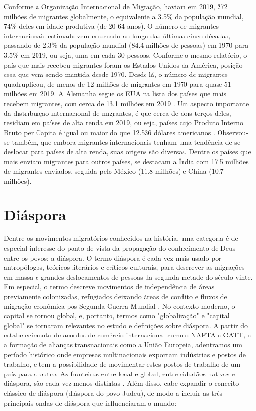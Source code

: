 \documentclass[12pt,openright,oneside,a4paper]{abntex2}
\begin{document}
Conforme a Organização Internacional de Migração, haviam em 2019, 272 milhões de migrantes globalmente, o equivalente a 3.5\% da população mundial, 74\% deles em idade produtiva (de 20-64 anos). O número de migrantes internacionais estimado vem crescendo ao longo das últimas cinco décadas, passando de 2.3\% da população mundial (84.4 milhões de pessoas) em 1970 para 3.5\% em 2019, ou seja, uma em cada 30 pessoas. Conforme o mesmo relatório, o país que mais recebeu migrantes foram os Estados Unidos da América, posição essa que vem sendo mantida desde 1970. Desde lá, o número de migrantes quadruplicou, de menos de 12 milhões de migrantes em 1970 para quase 51 milhões em 2019. A Alemanha segue os EUA na lista dos países que mais recebem migrantes, com cerca de 13.1 milhões em 2019 \cite[p. 21]{iom2020}. Um aspecto importante da distribuição internacional de migrantes, é que cerca de dois terços deles, residiam em países de alta renda em 2019, ou seja, países cujo Produto Interno Bruto per Capita é igual ou maior do que 12.536 dólares americanos \cite{world_bank_country_lending_groups}. Observou-se também, que embora migrantes internacionais tenham uma tendência de se deslocar para países de alta renda, suas origens são diversas.  Dentre os países que mais enviam migrantes para outros países, se destacam a Índia com 17.5 milhões de migrantes enviados, seguida pelo México (11.8 milhões) e China (10.7 milhões). 

\section{Diáspora}

Dentre os movimentos migratórios conhecidos na história, uma categoria é de especial interesse do ponto de vista da propagação do conhecimento de Deus entre os povos: a diáspora. O termo diáspora é cada vez mais usado por antropólogos, teóricos literários e críticos culturais, para descrever as migrações em massa e grandes deslocamentos de pessoas da segunda metade do século vinte. Em especial, o termo descreve movimentos de independência de áreas previamente colonizadas, refugiados deixando áreas de conflito e fluxos de migração econômica pós Segunda Guerra Mundial \cite[p. 11]{braziel}. No contexto moderno, o capital se tornou global, e, portanto, termos como "globalização" e "capital global" se tornaram relevantes no estudo e definições sobre diáspora. A partir do estabelecimento de acordos de comércio internacional como o NAFTA e GATT, e a formação de alianças transnacionais como a União Europeia, adentramos um período histórico onde empresas multinacionais exportam indústrias e postos de trabalho, e tem a possibilidade de movimentar estes postos de trabalho de um país para o outro. As fronteiras entre local e global, entre cidadãos nativos e diáspora, são cada vez menos distintas \cite[p. 19]{braziel}. Além disso, cabe expandir o conceito clássico de diáspora (diáspora do povo Judeu), de modo a incluir as três principais ondas de diáspora que influenciaram o mundo: 
\end{document}
